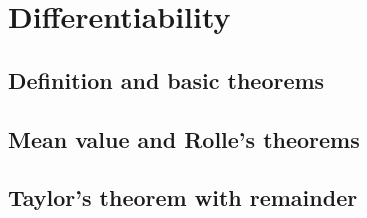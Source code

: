 
\section{Differentiability}

\subsection{Definition and basic theorems}


\subsection{Mean value and Rolle's theorems}


\subsection{Taylor's theorem with remainder}

